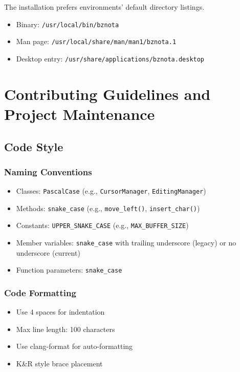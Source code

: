 \documentclass[12pt,a4paper,oneside,openany]{report}
\begin{document}
\par
The installation prefers environments' default directory listings.

\begin{itemize}
	\item Binary: \texttt{/usr/local/bin/bznota}
	\item Man page: \texttt{/usr/local/share/man/man1/bznota.1}
	\item Desktop entry: \texttt{/usr/share/applications/bznota.desktop}
\end{itemize}

\chapter{Contributing Guidelines and Project Maintenance}

\section{Code Style}

\subsection{Naming Conventions}

\begin{itemize}
	\item Classes: \texttt{PascalCase} (e.g., \texttt{CursorManager}, \texttt{EditingManager})
	\item Methods: \texttt{snake\_case} (e.g., \texttt{move\_left()}, \texttt{insert\_char()})
	\item Constants: \texttt{UPPER\_SNAKE\_CASE} (e.g., \texttt{MAX\_BUFFER\_SIZE})
	\item Member variables: \texttt{snake\_case} with trailing underscore (legacy) or no underscore (current)
	\item Function parameters: \texttt{snake\_case}
\end{itemize}

\subsection{Code Formatting}

\begin{itemize}
	\item Use 4 spaces for indentation
	\item Max line length: 100 characters
	\item Use clang-format for auto-formatting
	\item K\&R style brace placement
\end{itemize}
\end{document}
